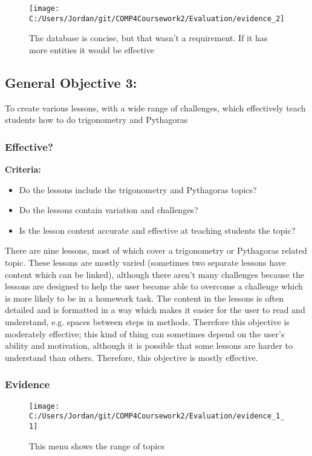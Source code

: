 \begin{figure}[H]
	\texttt{[image: C:/Users/Jordan/git/COMP4Coursework2/Evaluation/evidence\_2]}
	\caption{The database is concise, but that wasn't a requirement. If it has more entities it would be effective}
\end{figure}

\subsection{General Objective 3: }

To create various lessons, with a wide range of challenges, which effectively teach students how to do trigonometry and Pythagoras

\subsubsection{Effective?}

\textbf{Criteria: }

\begin{itemize}
	\item Do the lessons include the trigonometry and Pythagoras topics?
	\item Do the lessons contain variation and challenges?
	\item Is the lesson content accurate and effective at teaching students the topic?
\end{itemize}

There are nine lessons, most of which cover a trigonometry or Pythagoras related topic. These lessons are mostly varied (sometimes two separate lessons have content which can be linked), although there aren't many challenges because the lessons are designed to help the user become able to overcome a challenge which is more likely to be in a homework task. The content in the lessons is often detailed and is formatted in a way which makes it easier for the user to read and understand, e.g. spaces between steps in methods. Therefore this objective is moderately effective; this kind of thing can sometimes depend on the user's ability and motivation, although it is possible that some lessons are harder to understand than others. Therefore, this objective is mostly effective.

\subsubsection{Evidence}

\begin{figure}[H]
	\texttt{[image: C:/Users/Jordan/git/COMP4Coursework2/Evaluation/evidence\_1\_1]}
	\caption{This menu shows the range of topics}
\end{figure}

